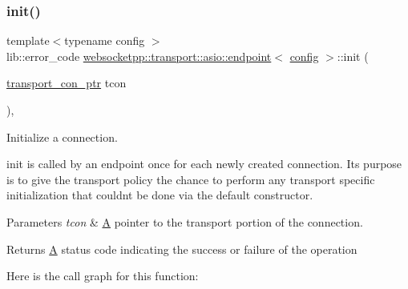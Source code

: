 \subsubsection{\texorpdfstring{init()}{init()}}
{\footnotesize\ttfamily template$<$typename config $>$ \\
lib\+::error\+\_\+code \mbox{\hyperlink{classwebsocketpp_1_1transport_1_1asio_1_1endpoint}{websocketpp\+::transport\+::asio\+::endpoint}}$<$ \mbox{\hyperlink{classconfig}{config}} $>$\+::init (\begin{DoxyParamCaption}\item[{\mbox{\hyperlink{classwebsocketpp_1_1transport_1_1asio_1_1endpoint_ac5fc306f32d15f92dd1b22366eaba62d}{transport\+\_\+con\+\_\+ptr}}}]{tcon }\end{DoxyParamCaption})\hspace{0.3cm}{\ttfamily [inline]}, {\ttfamily [protected]}}



Initialize a connection. 

init is called by an endpoint once for each newly created connection. It\textquotesingle{}s purpose is to give the transport policy the chance to perform any transport specific initialization that couldn\textquotesingle{}t be done via the default constructor.


\begin{DoxyParams}{Parameters}
{\em tcon} & \mbox{\hyperlink{struct_a}{A}} pointer to the transport portion of the connection.\\
\hline
\end{DoxyParams}
\begin{DoxyReturn}{Returns}
\mbox{\hyperlink{struct_a}{A}} status code indicating the success or failure of the operation 
\end{DoxyReturn}
Here is the call graph for this function\+:
\mbox{\label{classwebsocketpp_1_1transport_1_1asio_1_1endpoint_a67da637106d3cfb40078b477e2579a13}} 
